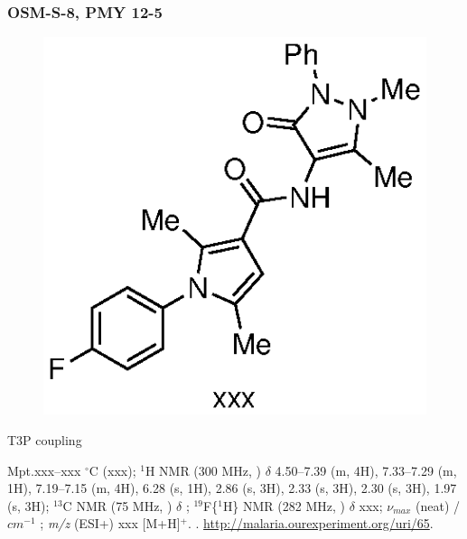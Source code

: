 \documentclass[12pt, a4paper,titlepage]{article}
\begin{document}
\subsubsection*{OSM-S-8, PMY 12-5}
 \label{exp:PMY12-5}
	\begin{figure}[H]
	\begin{center}
	\includegraphics{exp/PMY12-5.eps}
	\end{center}
	\vspace{-25pt}	
	\end{figure}	

T3P coupling

Mpt.xxx--xxx $^\circ$C (xxx); 
$^1$H NMR (300 MHz, ) $\delta$ 4.50--7.39 (m, 4H), 7.33--7.29 (m, 1H), 7.19--7.15 (m, 4H), 6.28 (s, 1H), 2.86 (s, 3H), 2.33 (s, 3H), 2.30 (s, 3H), 1.97 (s, 3H); 
  $^{13}$C NMR (75 MHz, ) $\delta$ ; 
$^{19}$F\{$^1$H\} NMR (282 MHz, ) $\delta$ xxx; 
 $\nu_{max}$ (neat) /$cm^{-1}$ ; 
\emph{m/z} (ESI+) xxx [M+H]$^+$.
. 
\url{http://malaria.ourexperiment.org/uri/65}. 
\end{document}

